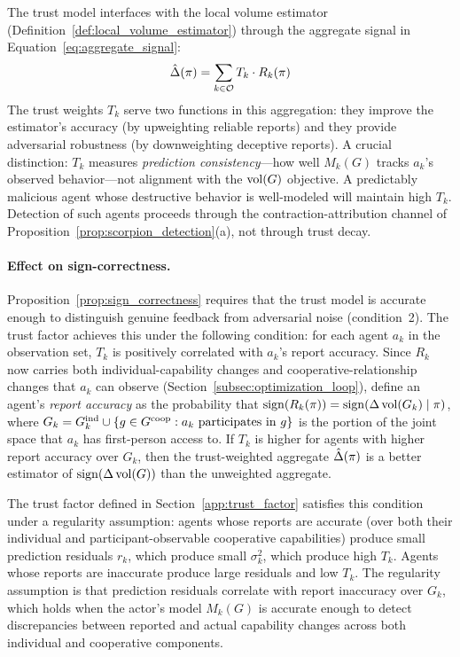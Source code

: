 The trust model interfaces with the local volume estimator (Definition~\ref{def:local_volume_estimator}) through the aggregate signal in Equation~\eqref{eq:aggregate_signal}:
\[
\hat{\Delta}(\pi) = \sum_{k \in \mathcal{O}} T_k \cdot R_k(\pi)
\]
The trust weights $T_k$ serve two functions in this aggregation: they improve the estimator's accuracy (by upweighting reliable reports) and they provide adversarial robustness (by downweighting deceptive reports). A crucial distinction: $T_k$ measures \emph{prediction consistency}---how well $M_k(G)$ tracks $a_k$'s observed behavior---not alignment with the $\operatorname{vol}(G)$ objective. A predictably malicious agent whose destructive behavior is well-modeled will maintain high $T_k$. Detection of such agents proceeds through the contraction-attribution channel of Proposition~\ref{prop:scorpion_detection}(a), not through trust decay.

\paragraph{Effect on sign-correctness.} Proposition~\ref{prop:sign_correctness}
requires that the trust model is accurate enough to distinguish genuine
feedback from adversarial noise (condition~2). The trust factor achieves this
under the following condition: for each agent $a_k$ in the observation set,
$T_k$ is positively correlated with $a_k$'s report accuracy. Since $R_k$ now
carries both individual-capability changes and cooperative-relationship changes
that $a_k$ can observe (Section~\ref{subsec:optimization_loop}), define an
agent's \emph{report accuracy} as the probability that $\operatorname{sign}(R_k(\pi)) =
\operatorname{sign}(\Delta \operatorname{vol}(G_k) \mid \pi)$, where $G_k = G_{k}^{\mathrm{ind}} \cup
\{g \in G^{\mathrm{coop}} : a_k \text{ participates in } g\}$ is the portion of the
joint space that $a_k$ has first-person access to. If $T_k$ is higher for
agents with higher report accuracy over $G_k$, then the trust-weighted
aggregate $\hat{\Delta}(\pi)$ is a better estimator of $\operatorname{sign}(\Delta \operatorname{vol}(G))$
than the unweighted aggregate.

The trust factor defined in Section~\ref{app:trust_factor} satisfies this
condition under a regularity assumption: agents whose reports are accurate
(over both their individual and participant-observable cooperative capabilities)
produce small prediction residuals $r_k$, which produce small $\sigma_k^2$,
which produce high $T_k$. Agents whose reports are inaccurate produce large
residuals and low $T_k$. The regularity assumption is that prediction
residuals correlate with report inaccuracy over $G_k$, which holds when the
actor's model $M_k(G)$ is accurate enough to detect discrepancies between
reported and actual capability changes across both individual and cooperative
components.

